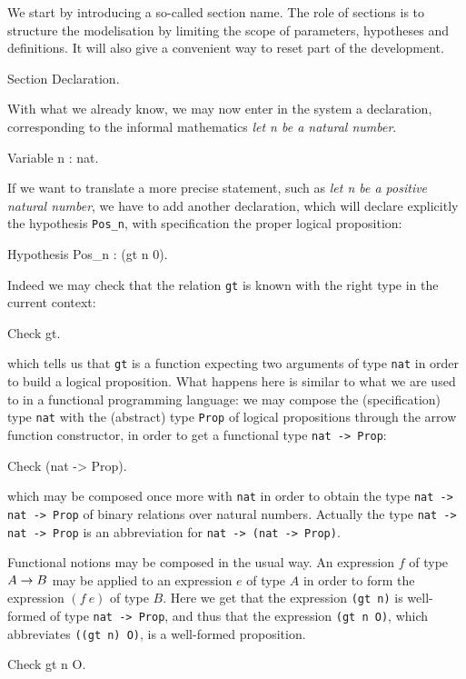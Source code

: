 \documentclass[11pt,a4paper]{book}
\begin{document}
We start by introducing a so-called section name. The role of sections
is to structure the modelisation by limiting the scope of parameters,
hypotheses and definitions. It will also give a convenient way to
reset part of the development.

\begin{coq_example}
Section Declaration.
\end{coq_example}
With what we already know, we may now enter in the system a declaration,
corresponding to the informal mathematics {\sl let n be a natural
  number}. 

\begin{coq_example}
Variable n : nat.
\end{coq_example}

If we want to translate a more precise statement, such as
{\sl let n be a positive natural number},
we have to add another declaration, which will declare explicitly the
hypothesis \verb:Pos_n:, with specification the proper logical
proposition:
\begin{coq_example}
Hypothesis Pos_n : (gt n 0).
\end{coq_example}

Indeed we may check that the relation \verb:gt: is known with the right type
in the current context:

\begin{coq_example}
Check gt.
\end{coq_example}

which tells us that \texttt{gt} is a function expecting two arguments of
type \texttt{nat} in order to build a logical proposition.
What happens here is similar to what we are used to in a functional
programming language: we may compose the (specification) type \texttt{nat}
with the (abstract) type \texttt{Prop} of logical propositions through the
arrow function constructor, in order to get a functional type
\texttt{nat -> Prop}:
\begin{coq_example}
Check (nat -> Prop).
\end{coq_example}
which may be composed once more with \verb:nat: in order to obtain the
type \texttt{nat -> nat -> Prop} of binary relations over natural numbers.
Actually the type \texttt{nat -> nat -> Prop} is an abbreviation for 
\texttt{nat -> (nat -> Prop)}.

Functional notions may be composed in the usual way. An expression $f$
of type $A\rightarrow B$ may be applied to an expression $e$ of type $A$ in order
to form the expression $(f~e)$ of type $B$. Here we get that
the expression \verb:(gt n): is well-formed of type \texttt{nat -> Prop},
and thus that the expression \verb:(gt n O):, which abbreviates
\verb:((gt n) O):, is a well-formed proposition.
\begin{coq_example}
Check gt n O.
\end{coq_example}
\end{document}
